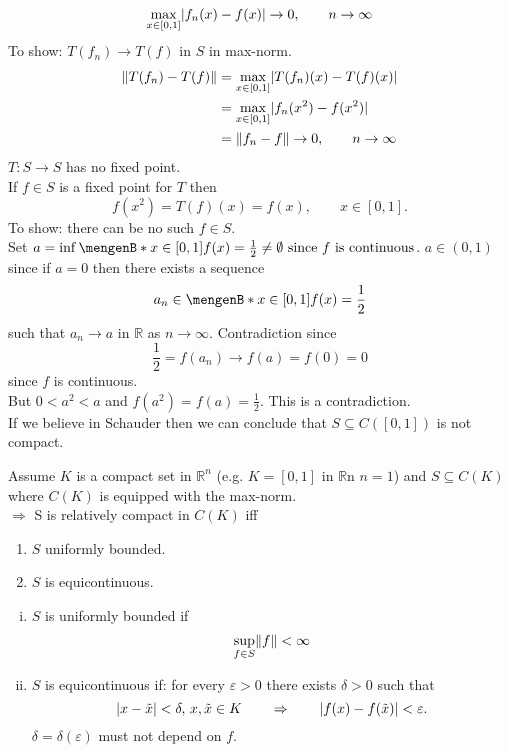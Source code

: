 \begin{beispiel}
	\[
		\max_{x \in [0,1]} \lvert f_n(x)-f(x)\rvert \to 0, \qquad n \to \infty
	\]
	To show: $T(f_n) \to T(f)$ in $S$ in max-norm.
	\begin{align*}
		\norm{T(f_n)-T(f)} &= \max_{x \in [0,1]}\abs{T(f_n)(x)- T(f)(x)} \\ & = \max_{x \in [0,1]}\abs{f_n(x^2)-f(x^2)}  \\ &= \norm{f_n -f} \to 0, \qquad n \to \infty
	\end{align*}
	$T: S \to S $ has no fixed point. \\
	If $f \in S$ is a fixed point for $T$ then 
	\[
		f(x^2) = T(f)(x) = f(x), \qquad x \in [0,1].
	\]
	To show: there can be no such $f \in S$. \\
	Set $a = \inf \set[x \in [0,1]]{f(x) = \frac{1}{2}} \neq \emptyset \text{ since $f$ is continuous}$. $a \in (0,1)$ since if $a = 0$ then there exists a sequence
	\[
		a_n \in \set[x \in [0,1]]{f(x)= \frac{1}{2}} 
	\]
	such that $a_n \to a$ in $\mathbb{R}$ as $n \to \infty$. Contradiction since 
	\[
		\frac{1}{2} = f(a_n) \to f(a) = f(0) = 0
	\]
	since $f$ is continuous. \\
	But $0 < a^2 < a$ and $f(a^2) = f(a) = \frac{1}{2}$. This is a contradiction. \\
	If we believe in Schauder then we can conclude that $S \subseteq C([0,1])$ is not compact.
\end{beispiel}
\begin{theorem}
	Assume $K$ is a compact set in $\mathbb{R}^n$ (e.g. $K = [0,1]$ in $\mathbb{R}$n $n=1$) and $S \subseteq C(K)$ where $C(K)$ is equipped with the max-norm. \\
	$\Rightarrow $ S is relatively compact in $C(K)$ iff
	\begin{enumerate}[(1)]
		\item $S$ uniformly bounded.
		\item $S$ is equicontinuous.
	\end{enumerate}
\end{theorem}
\begin{definition*}
	\begin{enumerate}[(i)]
		\item $S$ is uniformly bounded if
		\[
			\sup\limits_{f \in S} \norm{f} < \infty
		\]
		\item $S$ is equicontinuous if: for every $\varepsilon >0$ there exists $\delta >0$ such that
		\[
			\lvert x- \tilde x\rvert < \delta, \, x, \tilde x \in K \qquad \Rightarrow \qquad \lvert f(x)-f(\tilde x)\rvert< \varepsilon.
		\]
		$\delta = \delta (\varepsilon)$ must not depend on $f$. \\
	\end{enumerate}
\end{definition*}
